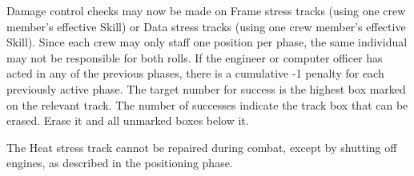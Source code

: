 Damage control checks may now be made on Frame stress tracks (using one crew member's effective  Skill) or Data stress tracks (using one crew member's effective  Skill). Since each crew may only staff one position per phase, the same individual may not be responsible for both rolls. If the engineer or computer officer has acted in any of the previous phases, there is a cumulative -1 penalty for each previously active phase. The target number for success is the highest box marked on the relevant track. The number of successes indicate the track box that can be erased. Erase it and all unmarked boxes below it.

The Heat stress track cannot be repaired during combat, except by shutting off engines, as described in the positioning phase.

